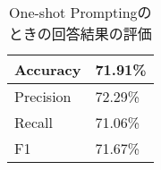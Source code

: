 \begin{table}[H]
\centering
\caption{One-shot Promptingのときの回答結果の評価}
\begin{tabular}{|l|l|}
\hline
Accuracy    & 71.91\% \\ \hline
Precision   & 72.29\% \\ \hline
Recall      & 71.06\% \\ \hline
F1          & 71.67\% \\ \hline
\end{tabular}
\label{cf-sw40-ex1-m}
\end{table}